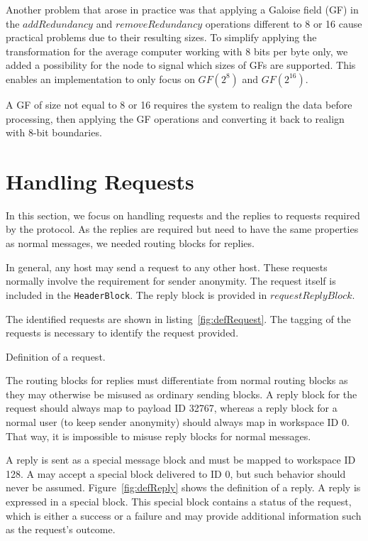 Another problem that arose in practice was that applying a Galoise field (GF) in the $addRedundancy$ and $removeRedundancy$ operations different to 8 or 16 cause practical problems due to their resulting sizes. To simplify applying the transformation for the average computer working with 8 bits per byte only, we added a possibility for the node to signal which sizes of GFs are supported. This enables an implementation to only focus on $GF(2^8)$ and $GF(2^{16})$.

A GF of size not equal to 8 or 16 requires the system to realign the data before processing, then applying the GF operations and converting it back to realign with 8-bit boundaries.

\section{Handling Requests} 
In this section, we focus on handling requests and the replies to requests required by the protocol. As the replies are required but need to have the same properties as normal messages, we needed routing blocks for replies.

In general, any host may send a request to any other host. These requests normally involve the requirement for sender anonymity. The request itself is included in the \lstinline[columns=fixed,basicstyle=\normalsize]{HeaderBlock}. The reply block is provided in $requestReplyBlock$.

The identified requests are shown in listing~\ref{fig:defRequest}. The tagging of the requests is necessary to identify the request provided.

\begin{lstfloat}[ht]
	
	\caption{Definition of a request.}
	\label{fig:defRequest}
\end{lstfloat}

The routing blocks for replies must differentiate from normal routing blocks as they may otherwise be misused as ordinary sending blocks. A reply block for the request should always map to payload ID 32767, whereas a reply block for a normal user (to keep sender anonymity) should always map in workspace ID 0. That way, it is impossible to misuse reply blocks for normal messages.

A reply is sent as a special message block and must be mapped to workspace ID 128. A \VortexNode{} may accept a special block delivered to ID 0, but such behavior should never be assumed. Figure~\ref{fig:defReply} shows the definition of a reply. A reply is expressed in a special block. This special block contains a status of the request, which is either a success or a failure and may provide additional information such as the request's outcome.

